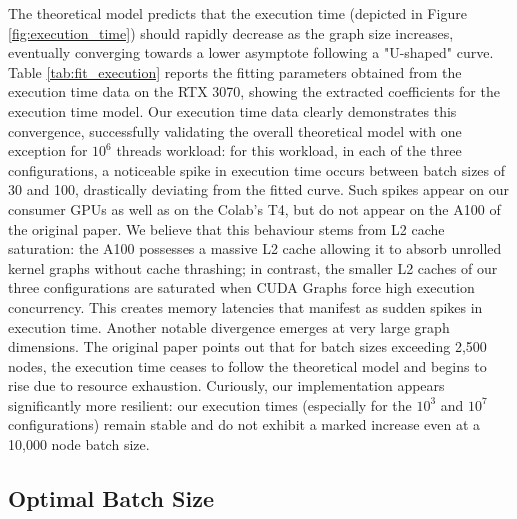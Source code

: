 \documentclass[10pt,twocolumn]{article}
\begin{document}
The theoretical model predicts that the execution time (depicted in Figure \ref{fig:execution_time}) should rapidly decrease as the graph size increases, eventually converging towards a lower asymptote following a "U-shaped" curve. Table \ref{tab:fit_execution} reports the fitting parameters obtained from the execution time data on the RTX 3070, showing the extracted coefficients for the execution time model. Our execution time data clearly demonstrates this convergence, successfully validating the overall theoretical model with one exception for \(10^6\) threads workload: for this workload, in each of the three configurations, a noticeable spike in execution time occurs between batch sizes of 30 and 100, drastically deviating from the fitted curve. 
Such spikes appear on our consumer GPUs as well as on the Colab's T4, but do not appear on the A100 of the original paper.  
We believe that this behaviour stems from L2 cache saturation: the A100 possesses a massive L2 cache allowing it to absorb unrolled kernel graphs without cache thrashing; in contrast, the smaller L2 caches of our three configurations are saturated when CUDA Graphs force high execution concurrency. This creates memory latencies that manifest as sudden spikes in execution time.
Another notable divergence emerges at very large graph dimensions. The original paper points out that for batch sizes exceeding 2,500 nodes, the execution time ceases to follow the theoretical model and begins to rise due to resource exhaustion. Curiously, our implementation appears significantly more resilient: our execution times (especially for the \(10^3\) and \(10^7\) configurations) remain stable and do not exhibit a marked increase even at a 10,000 node batch size.

\subsection{Optimal Batch Size}
\end{document}
